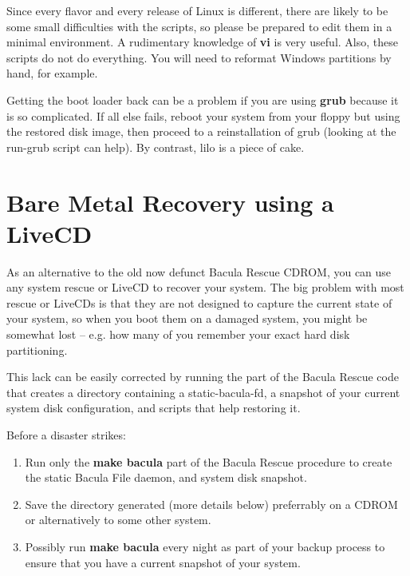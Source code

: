 Since every flavor and every release of Linux is different, there are likely
to be some small difficulties with the scripts, so please be prepared to edit
them in a minimal environment. A rudimentary knowledge of {\bf vi} is very
useful. Also, these scripts do not do everything. You will need to reformat
Windows partitions by hand, for example. 

Getting the boot loader back can be a problem if you are using {\bf grub}
because it is so complicated. If all else fails, reboot your system from your
floppy but using the restored disk image, then proceed to a reinstallation of
grub (looking at the run-grub script can help). By contrast, lilo is a piece
of cake. 

\label{LiveCD}
\section{Bare Metal Recovery using a LiveCD}

As an alternative to the old now defunct Bacula Rescue CDROM, you can use any
system rescue or LiveCD to recover your system. The big problem
with most rescue or LiveCDs is that they are not designed to
capture the current state of your system, so when you boot them on
a damaged system, you might be somewhat lost -- e.g. how many of
you remember your exact hard disk partitioning.

This lack can be easily corrected by running the part of the
Bacula Rescue code that creates a directory containing a   
static-bacula-fd, a snapshot of your current system disk
configuration, and scripts that help restoring it.

Before a disaster strikes:
\begin{enumerate}
\item Run only the {\bf make bacula} part of the
  Bacula Rescue procedure to create the static Bacula
  File daemon, and system disk snapshot. 
\item Save the directory generated (more details below)
  preferrably on a CDROM or alternatively to some other
  system.
\item Possibly run {\bf make bacula} every night as
  part of your backup process to ensure that you have
  a current snapshot of your system.
\end{enumerate}

